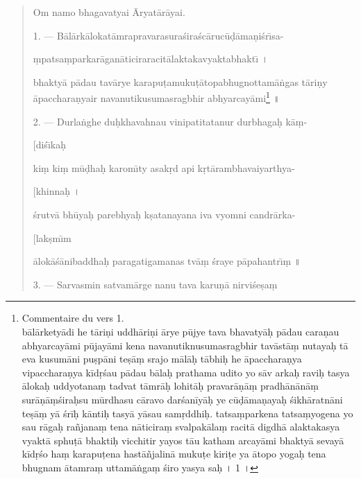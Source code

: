 \documentclass[a4paper, 11pt, oneside, french]{article}
\begin{document}
\begin{quotation}
Om namo bhagavatyai \={A}ryat\={a}r\={a}yai.

\bigskip

1. --- B\={a}l\={a}rk\={a}lokat\={a}mrapravarasura\'{s}ira\'{s}c\={a}ruc\={u}\d{d}\={a}ma\d{n}i\'{s}r\={\i}sa-

\d{m}patsa\d{m}parkar\={a}gan\={a}ticiraracit\={a}laktakavyaktabhakt\={\i} \texthindi{।}

bhakty\={a} p\={a}dau tav\={a}rye karapu\d{t}amuku\d{t}\={a}topabhugnottam\={a}\.{n}gas t\={a}ri\d{n}y \={a}pacchara\d{n}yair navanutikusumasragbhir abhyarcay\={a}mi\footnote{Commentaire du vers 1.\\\hspace*{5mm}bālārketyādi he tāriṇi uddhāriṇi ārye pūjye tava bhavatyāḥ pādau caraṇau abhyarcayāmi pūjayāmi kena navanutiknusumasragbhir tavāstāṃ nutayaḥ tā eva kusumāni puṣpāni teṣāṃ srajo mālāḥ tābhiḥ he āpaccharaṇya vipaccharaṇya kīdṛśau pādau bālaḥ prathama udito yo sāv arkaḥ raviḥ tasya ālokaḥ uddyotanaṃ tadvat tāmrāḥ lohitāḥ pravarāṇāṃ pradhānānāṃ surāṇāṃśiraḥsu mūrdhasu cāravo darśanīyāḥ ye cūḍāmaṇayaḥ śikhāratnāni teṣāṃ yā śrīḥ kāntiḥ tasyā yāsau samṛddhiḥ. tatsaṃparkena tatsaṃyogena yo sau rāgaḥ rañjanaṃ tena nāticiraṃ svalpakālaṃ racitā digdhā alaktakasya vyaktā sphuṭā bhaktiḥ vicchitir yayos tāu katham arcayāmi bhaktyā sevayā kīdṛśo haṃ karapuṭena hastāñjalinā mukuṭe kiriṭe ya ātopo yogaḥ tena bhugnam ātamraṃ uttamāṅgaṃ śiro yasya saḥ \texthindi{।} 1 \texthindi{।}} \texthindi{॥}

\bigskip

2. --- Durla\.{n}ghe du\d{h}khavahnau vinipatitatanur durbhaga\d{h} k\={a}\d{m}-

\hspace*{85mm}[di\'{s}\={\i}ka\d{h}

ki\d{m} ki\d{m} m\={u}\d{d}ha\d{h} karom\={\i}ty asak\d{r}d api k\d{r}t\={a}rambhavaiyarthya-

\hspace*{85mm}[khinna\d{h} \texthindi{।}

\'{s}rutv\={a} bh\={u}ya\d{h} parebhya\d{h} k\d{s}atanayana iva vyomni candr\={a}rka-

\hspace*{85mm}[lak\d{s}m\={\i}m

\={a}lok\={a}\'{s}\={a}nibaddha\d{h} paragatigamanas tv\={a}\d{m} \'{s}raye p\={a}pahantr\={\i}\d{m} \texthindi{॥}

\bigskip

3. --- Sarvasmin satvam\={a}rge nanu tava karu\d{n}\={a} nirvi\'{s}e\d{s}a\d{m}


\end{quotation}
\end{document}
